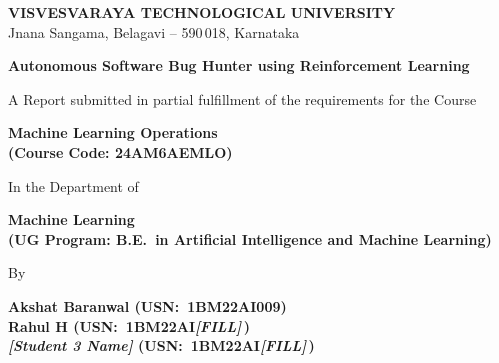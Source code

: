 \documentclass[12pt,a4paper]{report}
\newcommand{\btitle}{Autonomous Software Bug Hunter using Reinforcement Learning}
\newcommand{\coursename}{Machine Learning Operations}
\newcommand{\coursecode}{24AM6AEMLO}
\newcommand{\deptname}{Machine Learning}
\newcommand{\studentA}{Akshat Baranwal \quad (USN:~1BM22AI009)}
\newcommand{\studentB}{Rahul H          \quad (USN:~1BM22AI\textit{[FILL]}\,)}
\newcommand{\studentC}{\textit{[Student 3 Name]}  \quad (USN:~1BM22AI\textit{[FILL]}\,)}
\begin{document}

\begin{titlepage}
\thispagestyle{empty}
\begin{center}

\textbf{\fontsize{18}{22}\selectfont VISVESVARAYA TECHNOLOGICAL UNIVERSITY}\\[4pt]
{\fontsize{14}{18}\selectfont Jnana Sangama, Belagavi -- 590\,018, Karnataka}

\vspace{1.8cm}

\textbf{\fontsize{18}{22}\selectfont \btitle}

\vspace{0.7cm}

{\fontsize{14}{18}\selectfont A Report submitted in partial fulfillment of the requirements for the Course}

\vspace{0.4cm}

\textbf{\fontsize{18}{22}\selectfont \coursename}\\[4pt]
\textbf{\fontsize{14}{18}\selectfont (Course Code: \coursecode)}

\vspace{0.5cm}

{\fontsize{14}{18}\selectfont In the Department of}

\vspace{0.3cm}

\textbf{\fontsize{18}{22}\selectfont \deptname}\\[4pt]
\textbf{\fontsize{14}{18}\selectfont (UG Program: B.E.\ in Artificial Intelligence and Machine Learning)}

\vspace{0.8cm}

{\fontsize{14}{18}\selectfont By}

\vspace{0.4cm}

\textbf{\fontsize{14}{18}\selectfont \studentA}\\[4pt]
\textbf{\fontsize{14}{18}\selectfont \studentB}\\[4pt]
\textbf{\fontsize{14}{18}\selectfont \studentC}

\vspace{0.5cm}


\end{center}
\end{titlepage}
\end{document}
